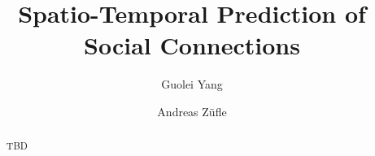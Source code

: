 \documentclass[sigconf]{acmart}
\begin{document}



\title{Spatio-Temporal Prediction of Social Connections}


\author{Guolei Yang}

\author{Andreas Z\"ufle}


\begin{abstract}
TBD
\end{abstract}


\iffalse

\begin{CCSXML}
<ccs2012>
<concept>
<concept_id>10002951.10003227.10003236.10003101</concept_id>
<concept_desc>Information systems~Location based services</concept_desc>
<concept_significance>500</concept_significance>
</concept>
<concept>
<concept_id>10002951.10003227.10003351</concept_id>
<concept_desc>Information systems~Data mining</concept_desc>
<concept_significance>500</concept_significance>
</concept>
<concept>
<concept_id>10010147.10010257</concept_id>
<concept_desc>Computing methodologies~Machine learning</concept_desc>
<concept_significance>300</concept_significance>
</concept>
</ccs2012>
\end{CCSXML}

\ccsdesc[500]{Information systems~Location based services}
\ccsdesc[500]{Information systems~Data mining}
\ccsdesc[300]{Computing methodologies~Machine learning}


\keywords{}

\fi

\maketitle














\end{document}

